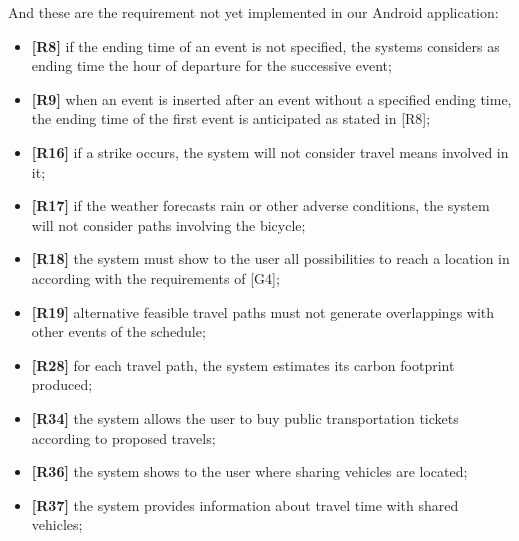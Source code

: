 And these are the requirement not yet implemented in our Android application:
\begin{itemize}
	\item \textbf{[R8]} if the ending time of an event is not specified, the systems considers as ending time the hour of departure for the successive event;
	\item \textbf{[R9]} when an event is inserted after an event without a specified ending time, the ending time  of the first event is anticipated as stated in [R8];
	\item \textbf{[R16]} if a strike occurs, the system will not consider travel means involved in it;
	\item \textbf{[R17]} if the weather forecasts rain or other adverse conditions, the system will not consider paths involving the bicycle;
	\item \textbf{ [R18]} the system must show to the user all possibilities to reach a location in according with the requirements of [G4];
	\item \textbf{[R19]} alternative feasible travel paths must not generate overlappings with other events of the schedule;
	\item \textbf{[R28]} for each travel path, the system estimates its carbon footprint produced;
	\item \textbf{[R34]} the system allows the user to buy public transportation tickets according to proposed travels;
	\item \textbf{[R36]} the system shows to the user where sharing vehicles are located;
	\item \textbf{[R37]} the system provides information about travel time with shared vehicles;
\end{itemize}
